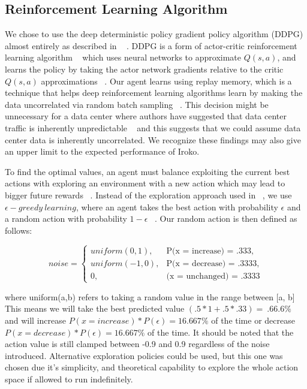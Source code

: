 \subsection{Reinforcement Learning Algorithm}

We chose to use the deep deterministic policy gradient policy algorithm (DDPG) almost entirely as described in ~\cite{DDPG} . DDPG is a form of actor-critic reinforcement learning algorithm ~\cite{Sutton:1998:IRL:551283} which uses neural networks to approximate $Q(s,a)$, and learns the policy by taking the actor network gradients relative to the critic $Q(s,a)$ approximations ~\cite{DDPG}.  Our agent learns using replay memory, which is a technique that helps deep reinforcement learning algorithms learn by making the data uncorrelated via random batch sampling ~\cite{DQLearning}. This decision might be unnecessary for a data center where authors have suggested that data center traffic is inherently unpredictable ~\cite{microte} and this suggests that we could assume data center data is inherently uncorrelated. We recognize these findings may also give an upper limit to the expected performance of Iroko. 

To find the optimal values, an agent must balance exploiting the current best actions with exploring an environment with a new action which may lead to bigger future rewards ~\cite{Sutton:1998:IRL:551283}. Instead of the exploration approach used in ~\cite{DDPG}, we use $\epsilon-greedy\ learning$, where an agent takes the best action with probability $\epsilon$ and a random action with probability $1 - \epsilon$ ~\cite{Sutton:1998:IRL:551283}. Our random action is then defined as follows:

\[
noise = 
\begin{cases}

uniform(0,1), &\text{P(x = increase) = .333},\\
uniform(-1,0), &\text{P(x = decrease) = .3333},\\
0, & \text{(x = unchanged) = .3333}
\end{cases}
\]

where uniform(a,b) refers to taking a random value in the range between [a, b]
This means we will take the best predicted value $(.5 * 1 + .5 * .33) =  ~.66.6\%$  and will increase $P(x= increase) * P(\epsilon) = 16. 667\%$ of the time or decrease $P(x= decrease) * P(\epsilon) = 16. 667\%$ of the time. It should be noted that the action value is still clamped between -0.9 and 0.9 regardless of the noise introduced. Alternative exploration policies could be used, but this one was chosen due it’s simplicity, and theoretical capability to explore the whole action space if allowed to run indefinitely.

